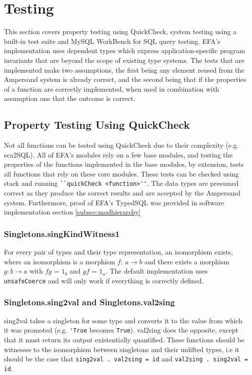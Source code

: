 \section{Testing}

This section covers property testing using QuickCheck, system testing using a 
built-in test suite and MySQL WorkBench for SQL query testing. EFA's 
implementation uses dependent types which express application-specific program 
invariants that are beyond the scope of existing type systems. The tests that 
are implemented make two assumptions, the first being any element reused from 
the Ampersand system is already correct, and the second being that if the 
properties of a function are correctly implemented, when used in combination 
with assumption one that the outcome is correct.

\subsection{Property Testing Using QuickCheck}
Not all functions can be tested using QuickCheck due to their complexity (e.g. 
eca2SQL). All of EFA's modules rely on a few base modules, and testing the 
properties of the functions implemented in the base modules, by extension, 
tests all functions that rely on these core modules. These tests can be checked 
using stack and running \verb|``quickCheck <function>''|. The data types are 
presumed correct as they produce the correct results and are accepted by the 
Ampersand system. Furthermore, proof of EFA's TypedSQL was provided in software 
implementation section \ref{subsec:modhierarchy}

\subsubsection*{Singletons.singKindWitness1}
For every pair of types and their type representation, an isomorphism exists,
where an isomorphism is a morphism $f:\ a \rightarrow b$ and there exists a
morphism $g: b \rightarrow a$ with $fg$ = $1_b$ and $gf$ = $1_a$. The default
implementation uses \lstinline{unsafeCoerce} and will only work if everything
is correctly defined.
         

\subsubsection*{Singletons.sing2val  and  Singletons.val2sing}
sing2val takes a singleton for some type and converts it to the value
from which it was promoted (e.g. \lstinline{'True} becomes \lstinline{True}).
val2sing does the opposite, except that it must return its output 
existentially quantified. These functions should be witnesses to the isomorphism
between singletons and their unlifted types, i.e it should be the case
that \lstinline{sing2val . val2sing = id} and \lstinline{val2sing . sing2val = id}. 


